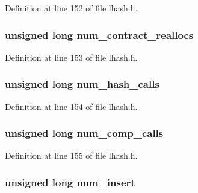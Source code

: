 Definition at line 152 of file lhash.\+h.

\subsubsection[{\texorpdfstring{num\+\_\+contract\+\_\+reallocs}{num_contract_reallocs}}]{\setlength{\rightskip}{0pt plus 5cm}unsigned long num\+\_\+contract\+\_\+reallocs}\hypertarget{structlhash__st_a9295a6e4b1536d97e6efa8bb0e8adf54}{}\label{structlhash__st_a9295a6e4b1536d97e6efa8bb0e8adf54}


Definition at line 153 of file lhash.\+h.

\subsubsection[{\texorpdfstring{num\+\_\+hash\+\_\+calls}{num_hash_calls}}]{\setlength{\rightskip}{0pt plus 5cm}unsigned long num\+\_\+hash\+\_\+calls}\hypertarget{structlhash__st_a799e297b72d77b6216fa782e586b82b5}{}\label{structlhash__st_a799e297b72d77b6216fa782e586b82b5}


Definition at line 154 of file lhash.\+h.

\subsubsection[{\texorpdfstring{num\+\_\+comp\+\_\+calls}{num_comp_calls}}]{\setlength{\rightskip}{0pt plus 5cm}unsigned long num\+\_\+comp\+\_\+calls}\hypertarget{structlhash__st_a1d007833a30562acedb2994369c22deb}{}\label{structlhash__st_a1d007833a30562acedb2994369c22deb}


Definition at line 155 of file lhash.\+h.

\subsubsection[{\texorpdfstring{num\+\_\+insert}{num_insert}}]{\setlength{\rightskip}{0pt plus 5cm}unsigned long num\+\_\+insert}\hypertarget{structlhash__st_a89aa2ffaf106815d464e83179467d4bc}{}\label{structlhash__st_a89aa2ffaf106815d464e83179467d4bc}


